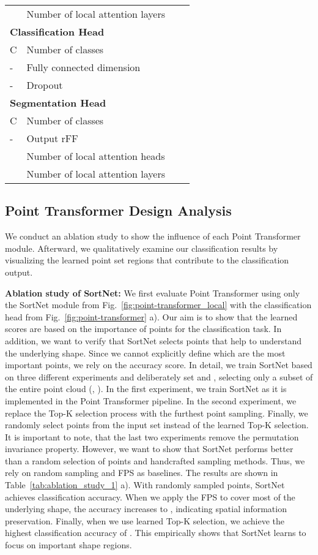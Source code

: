 \documentclass{ieeeaccess}
\begin{document}
\begin{table}[th!]
{\begin{tabular}{@{}llcc@{}}
 & Number of local attention layers &  &  \\
\multicolumn{4}{l}{\textbf{Classification Head}} \\
C & Number of classes & \multicolumn{2}{c}{} \\
- & Fully connected dimension& \multicolumn{2}{c}{} \\
- & Dropout & \multicolumn{2}{c}{} \\
\multicolumn{4}{l}{\textbf{Segmentation Head}} \\
C & Number of classes & \multicolumn{2}{c}{} \\
- & Output rFF& \multicolumn{2}{c}{} \\
 & Number of local attention heads &  &  \\
 & Number of local attention layers &  &  \\
 \bottomrule
 
\end{tabular}
}

\end{table}


\subsection{Point Transformer Design Analysis}
We conduct an ablation study to show the influence of each Point Transformer module. Afterward, we qualitatively examine our classification results by visualizing the learned point set regions that contribute to the classification output. 

\textbf{Ablation study of SortNet:}
We first evaluate Point Transformer using only the SortNet module from Fig.~\ref{fig:point-transformer_local} with the classification head from Fig.~\ref{fig:point-transformer} a). Our aim is to show that the learned scores are based on the importance of points for the classification task. In addition, we want to verify that SortNet selects points that help to understand the underlying shape. Since we cannot explicitly define which are the most important points, we rely on the accuracy score.
In detail, we train SortNet based on three different experiments and deliberately set  and , selecting only a subset of the entire point cloud (, ).
In the first experiment, we train SortNet as it is implemented in the Point Transformer pipeline. 
In the second experiment, we replace the Top-K selection process with the furthest point sampling.
Finally, we randomly select  points from the input set instead of the learned Top-K selection. It is important to note, that the last two experiments remove the permutation invariance property. However, we want to show that SortNet performs better than a random selection of points and handcrafted sampling methods. Thus, we rely on random sampling and FPS as baselines.
The results are shown in Table~\ref{tab:ablation_study_1} a). With randomly sampled points, SortNet achieves  classification accuracy. When we apply the FPS to cover most of the underlying shape, the accuracy increases to , indicating  spatial information preservation. Finally, when we use learned Top-K selection, we achieve the highest classification accuracy of . This empirically shows that SortNet learns to focus on important shape regions.
\end{document}

